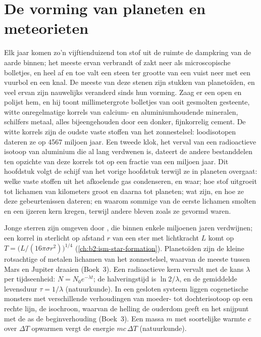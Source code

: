 \chapter{De vorming van planeten en meteorieten}\label{ch:b2:planet-formation-meteorites}

Elk jaar komen zo'n vijftienduizend ton stof uit de ruimte de dampkring van de aarde
binnen; het meeste ervan verbrandt of zakt neer als microscopische bolletjes, en heel
af en toe valt een steen ter grootte van een vuist neer met een vuurbol en een knal.
De meeste van deze stenen zijn stukken van planetoïden, en veel ervan zijn nauwelijks veranderd
sinds hun vorming. Zaag er een open en polijst hem, en hij toont millimetergrote
bolletjes van ooit gesmolten gesteente, witte onregelmatige korrels van calcium- en
aluminiumhoudende mineralen, schilfers metaal, alles bijeengehouden door een donker, fijnkorrelig cement. De witte
korrels zijn de oudste vaste stoffen van het zonnestelsel: loodisotopen dateren ze op
4567 miljoen jaar. Een tweede klok, het verval van een radioactieve isotoop van
aluminium die al lang verdwenen is, dateert de andere bestanddelen ten opzichte van
deze korrels tot op een fractie van een miljoen jaar. Dit hoofdstuk volgt de schijf van
het vorige hoofdstuk terwijl ze in planeten overgaat: welke vaste stoffen uit het afkoelende gas
condenseren, en waar; hoe stof uitgroeit tot lichamen van kilometers groot en daarna
tot planeten; wat  zijn, en hoe ze deze gebeurtenissen dateren; en waarom
sommige van de eerste lichamen smolten en een ijzeren kern kregen, terwijl andere bleven zoals ze
gevormd waren.

\begin{recall}
Jonge sterren zijn omgeven door , die binnen enkele
miljoenen jaren verdwijnen; een korrel in sterlicht op afstand $r$ van een ster met
lichtkracht $L$ komt op $T = \bigl(L/(16\pi\sigma r^2)\bigr)^{1/4}$
(\cref{ch:b2:ism-star-formation}). Planetoïden zijn de kleine rotsachtige of metalen
lichamen van het zonnestelsel, waarvan de meeste tussen Mars en Jupiter draaien
(Boek~3). Een radioactieve kern vervalt met de kans $\lambda$ per
tijdseenheid: $N = N_0 e^{-\lambda t}$; de halveringstijd is $\ln 2/\lambda$, en de gemiddelde
levensduur $\tau = 1/\lambda$ (natuurkunde). In een gesloten systeem liggen cogenetische monsters met
verschillende verhoudingen van moeder- tot dochterisotoop op een rechte lijn, de isochroon, waarvan de
helling de ouderdom geeft en het snijpunt met de as de beginverhouding (Boek~3).
Een massa $m$ met soortelijke warmte $c$ over $\Delta T$ opwarmen vergt de energie
$mc\,\Delta T$ (natuurkunde).
\end{recall}


